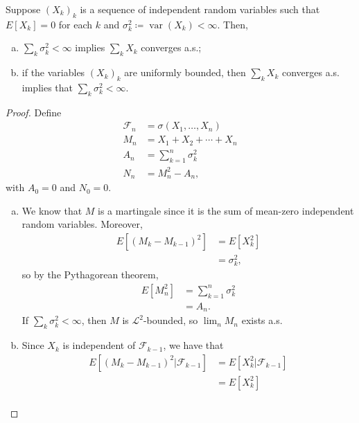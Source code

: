 \documentclass[10pt]{mypackage}
\renewcommand{\coloneq}{\coloneqq}
\begin{document}
\begin{theorem}
  Suppose $\left( X_k \right)_{k}$ is a sequence of independent random variables such that $E\left[ X_k \right]= 0$ for each $k$ and $\sigma_k^2\coloneq \operatorname{var}\left( X_k \right) < \infty$. Then,
  \begin{enumerate}[(a)]
    \item $\sum_{k}\sigma_k^2 < \infty$ implies $\sum_{k}X_k$ converges a.s.;
    \item if the variables $\left( X_k \right)_{k}$ are uniformly bounded, then $\sum_{k}X_k$ converges a.s. implies that $\sum_{k}\sigma_k^2 < \infty$.
  \end{enumerate}
\end{theorem}
\begin{proof}
  Define
  \begin{align*}
    \mathcal{F}_n &= \sigma\left( X_1,\dots,X_n \right)\\
    M_n &= X_1 + X_2 + \cdots + X_n\\
    A_n &= \sum_{k=1}^{n}\sigma_k^2\\
    N_n &= M_n^2-A_n,
  \end{align*}
  with $A_0 = 0$ and $N_0 = 0$.
  \begin{enumerate}[(a)]
    \item We know that $M$ is a martingale since it is the sum of mean-zero independent random variables. Moreover,
      \begin{align*}
        E\left[ \left( M_k-M_{k-1} \right)^2 \right] &= E\left[ X_k^2 \right]\\
                                                     &= \sigma_k^2,
      \end{align*}
      so by the Pythagorean theorem,
      \begin{align*}
        E\left[ M_n^2 \right] &= \sum_{k=1}^{n}\sigma_k^2\\
                              &= A_n.
      \end{align*}
      If $\sum_{k}\sigma_k^2 < \infty$, then $M$ is $\mathcal{L}^2$-bounded, so $\lim_{n}M_n$ exists a.s.
    \item Since $X_k$ is independent of $\mathcal{F}_{k-1}$, we have that
      \begin{align*}
        E\left[ \left( M_k-M_{k-1} \right)^2|\mathcal{F}_{k-1} \right] &= E\left[ X_k^2|\mathcal{F}_{k-1} \right]\\
                                                                       &= E\left[ X_k^2 \right]\\

\end{align*}
\end{enumerate}
\end{proof}
\end{document}

